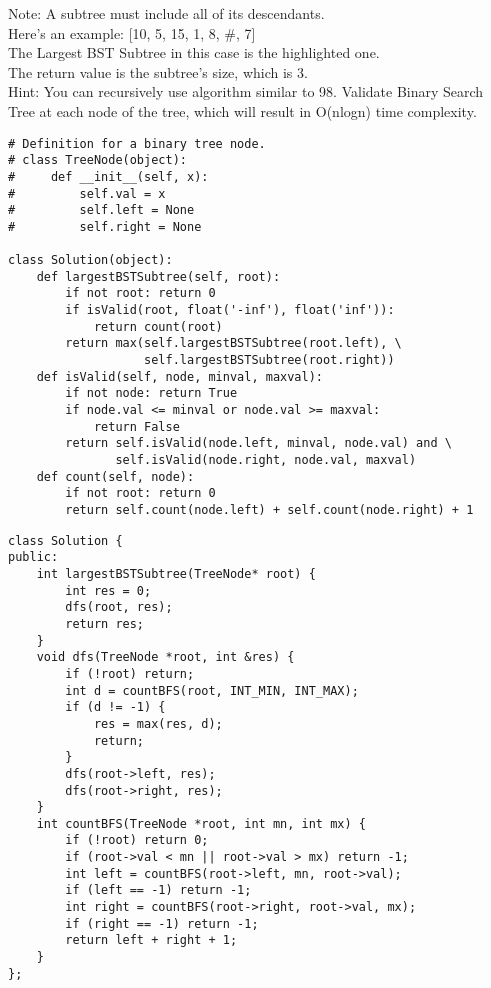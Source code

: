 Note: A subtree must include all of its descendants.\\

Here's an example: [10, 5, 15, 1, 8, \#, 7]\\
The Largest BST Subtree in this case is the highlighted one. \\
The return value is the subtree's size, which is 3.\\

Hint: You can recursively use algorithm similar to 98. Validate Binary Search Tree at each node of the tree, which will result in O(nlogn) time complexity.\\

\begin{lstlisting}
# Definition for a binary tree node.
# class TreeNode(object):
#     def __init__(self, x):
#         self.val = x
#         self.left = None
#         self.right = None

class Solution(object):
    def largestBSTSubtree(self, root):
        if not root: return 0
        if isValid(root, float('-inf'), float('inf')):
            return count(root)
        return max(self.largestBSTSubtree(root.left), \
                   self.largestBSTSubtree(root.right))
    def isValid(self, node, minval, maxval):
        if not node: return True
        if node.val <= minval or node.val >= maxval:
            return False
        return self.isValid(node.left, minval, node.val) and \
               self.isValid(node.right, node.val, maxval)
    def count(self, node):
        if not root: return 0
        return self.count(node.left) + self.count(node.right) + 1
\end{lstlisting}

\begin{lstlisting}
class Solution {
public:
    int largestBSTSubtree(TreeNode* root) {
        int res = 0;
        dfs(root, res);
        return res;
    }
    void dfs(TreeNode *root, int &res) {
        if (!root) return;
        int d = countBFS(root, INT_MIN, INT_MAX);
        if (d != -1) {
            res = max(res, d);
            return;
        }
        dfs(root->left, res);
        dfs(root->right, res);
    }
    int countBFS(TreeNode *root, int mn, int mx) {
        if (!root) return 0;
        if (root->val < mn || root->val > mx) return -1;
        int left = countBFS(root->left, mn, root->val);
        if (left == -1) return -1;
        int right = countBFS(root->right, root->val, mx);
        if (right == -1) return -1;
        return left + right + 1;
    }
};
\end{lstlisting}


